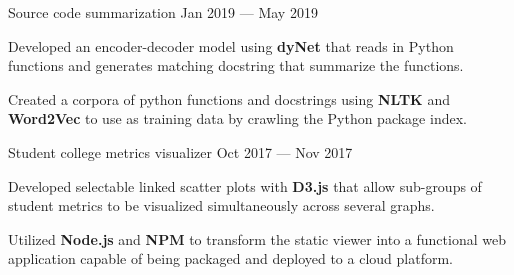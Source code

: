 
\vspace{-0.1cm}

\begin{cventries}

  \cventry
    {} %
    {Source code summarization} %
    {Jan 2019 --- May 2019} %
    {} %
    {
      \vspace{-1cm}
      \begin{cvitems} %
        \item Developed an encoder-decoder model using \textbf{dyNet} that reads in Python functions and generates matching docstring that summarize the functions.
        \item Created a corpora of python functions and docstrings using \textbf{NLTK} and \textbf{Word2Vec} to use as training data by crawling the Python package index.
      \end{cvitems}
    }
  \vspace{.2cm}
  \cventry
    {} %
    {Student college metrics visualizer} %
    {Oct 2017 --- Nov 2017} %
    {} %
    {
      \vspace{-1cm}
      \begin{cvitems} %
        \item Developed selectable linked scatter plots with \textbf{D3.js} that allow sub-groups of student metrics to be visualized simultaneously across several graphs.
        \item Utilized \textbf{Node.js} and \textbf{NPM} to transform the static viewer into a functional web application capable of being packaged and deployed to a cloud platform.
      \end{cvitems}
    }

\end{cventries}
